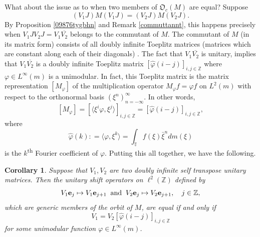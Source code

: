 \documentclass{dis}
\theoremstyle{plain}
\newtheorem{Corollary}[equation]{Corollary}
\theoremstyle{definition}
\def\T{\mathbb{T}}
\def\Z{\mathbb{Z}}
\renewcommand{\phi}{\varphi}
\renewcommand{\vec}[1]{{\bf #1}}
\newcommand{\0}{{\color{lightgray}0}}
\begin{document}
What about the issue as to when two members of $\mathfrak{O}_c(M)$ are equal? Suppose
$$(V_{1} J) M (V_{1} J) = (V_{2} J) M (V_{2} J).$$
By Proposition \ref{09876tygbhn} and Remark \ref{commuttannt}, this happens precisely when $V_{1} J V_{2} J = V_{1} \overline{V_{2}}$ belongs to the commutant of $M$. The commutant of $M$ (in its matrix form) consists of all doubly infinite Toeplitz matrices (matrices which are constant along each of their diagonals) \cite[p.~358]{MR4545809}. The fact that $V_{1} \overline{V_{2}}$ is unitary, implies that  $V_{1} \overline{V_{2}}$ is a doubly infinite Toeplitz matrix $[\widehat{\phi}(i - j)]_{i, j \in \Z}$ where $\phi \in L^{\infty}(m)$ is  a unimodular. In fact, this Toeplitz matrix is the matrix representation $[M_{\phi}]$ of the multiplication operator $M_{\phi} f = \phi f$ on $L^2(m)$ with respect to the orthonormal basis $(\xi^n)_{n = -\infty}^{\infty}$. In other words,
$$[M_{\phi}] =[ \langle \xi^{i} \phi, \xi^{j}\rangle]_{i, j \in \Z} = [\widehat{\phi}(i - j)]_{i, j \in \Z},$$
where 
$$\widehat{\phi}(k) : = \langle \phi, \xi^{k}\rangle = \int_{\T} f(\xi) \bar \xi^{n} dm(\xi)$$ is the $k$\textsuperscript{th} Fourier coefficient of $\phi$. 
  Putting this all together, we have the following. 

\begin{Corollary}
Suppose that $V_{1}, V_{2}$ are two doubly infinite self transpose unitary matrices. Then the unitary shift operators on $\ell^2(\Z)$ defined by
\begin{equation}\label{bbbbbVoneVtwo}
V_1 \vec{e}_{j} \mapsto V_1 \vec{e}_{j + 1} \; \; \mbox{and} \; \; V_{2} \vec{e}_{j} \mapsto V_{2} \vec{e}_{j + 1}, \quad j \in \Z,
\end{equation}
which are generic members of the orbit of $M$, are equal if and only if
$$V_{1} = V_{2} [\widehat{\phi}(i - j)]_{i, j \in \Z}$$ for some unimodular function $\phi \in L^{\infty}(m)$.
\end{Corollary}
\end{document}
